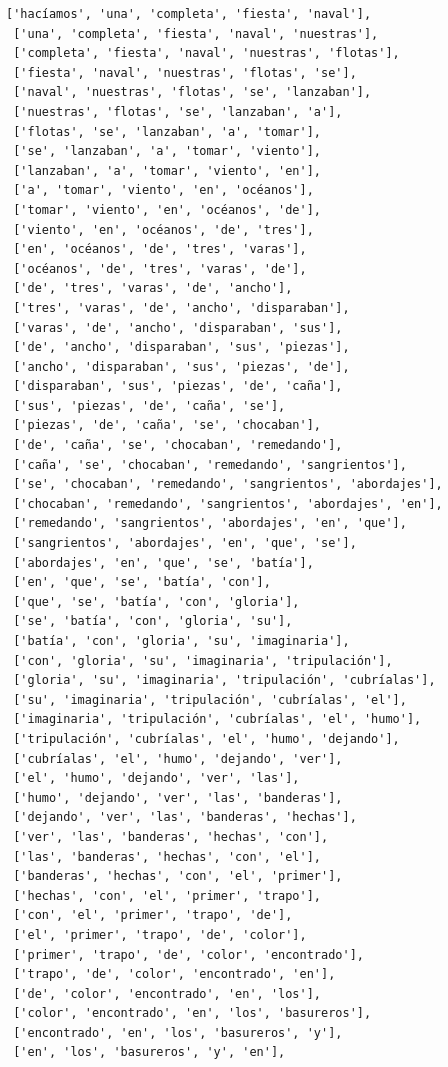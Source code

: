 \documentclass[11pt]{article}
\begin{document}
\begin{tcolorbox}[breakable, size=fbox, boxrule=1pt, pad at break*=1mm,colback=cellbackground, colframe=cellborder]
\begin{Verbatim}[commandchars=\\\{\}]
 ['hacíamos', 'una', 'completa', 'fiesta', 'naval'],
 ['una', 'completa', 'fiesta', 'naval', 'nuestras'],
 ['completa', 'fiesta', 'naval', 'nuestras', 'flotas'],
 ['fiesta', 'naval', 'nuestras', 'flotas', 'se'],
 ['naval', 'nuestras', 'flotas', 'se', 'lanzaban'],
 ['nuestras', 'flotas', 'se', 'lanzaban', 'a'],
 ['flotas', 'se', 'lanzaban', 'a', 'tomar'],
 ['se', 'lanzaban', 'a', 'tomar', 'viento'],
 ['lanzaban', 'a', 'tomar', 'viento', 'en'],
 ['a', 'tomar', 'viento', 'en', 'océanos'],
 ['tomar', 'viento', 'en', 'océanos', 'de'],
 ['viento', 'en', 'océanos', 'de', 'tres'],
 ['en', 'océanos', 'de', 'tres', 'varas'],
 ['océanos', 'de', 'tres', 'varas', 'de'],
 ['de', 'tres', 'varas', 'de', 'ancho'],
 ['tres', 'varas', 'de', 'ancho', 'disparaban'],
 ['varas', 'de', 'ancho', 'disparaban', 'sus'],
 ['de', 'ancho', 'disparaban', 'sus', 'piezas'],
 ['ancho', 'disparaban', 'sus', 'piezas', 'de'],
 ['disparaban', 'sus', 'piezas', 'de', 'caña'],
 ['sus', 'piezas', 'de', 'caña', 'se'],
 ['piezas', 'de', 'caña', 'se', 'chocaban'],
 ['de', 'caña', 'se', 'chocaban', 'remedando'],
 ['caña', 'se', 'chocaban', 'remedando', 'sangrientos'],
 ['se', 'chocaban', 'remedando', 'sangrientos', 'abordajes'],
 ['chocaban', 'remedando', 'sangrientos', 'abordajes', 'en'],
 ['remedando', 'sangrientos', 'abordajes', 'en', 'que'],
 ['sangrientos', 'abordajes', 'en', 'que', 'se'],
 ['abordajes', 'en', 'que', 'se', 'batía'],
 ['en', 'que', 'se', 'batía', 'con'],
 ['que', 'se', 'batía', 'con', 'gloria'],
 ['se', 'batía', 'con', 'gloria', 'su'],
 ['batía', 'con', 'gloria', 'su', 'imaginaria'],
 ['con', 'gloria', 'su', 'imaginaria', 'tripulación'],
 ['gloria', 'su', 'imaginaria', 'tripulación', 'cubríalas'],
 ['su', 'imaginaria', 'tripulación', 'cubríalas', 'el'],
 ['imaginaria', 'tripulación', 'cubríalas', 'el', 'humo'],
 ['tripulación', 'cubríalas', 'el', 'humo', 'dejando'],
 ['cubríalas', 'el', 'humo', 'dejando', 'ver'],
 ['el', 'humo', 'dejando', 'ver', 'las'],
 ['humo', 'dejando', 'ver', 'las', 'banderas'],
 ['dejando', 'ver', 'las', 'banderas', 'hechas'],
 ['ver', 'las', 'banderas', 'hechas', 'con'],
 ['las', 'banderas', 'hechas', 'con', 'el'],
 ['banderas', 'hechas', 'con', 'el', 'primer'],
 ['hechas', 'con', 'el', 'primer', 'trapo'],
 ['con', 'el', 'primer', 'trapo', 'de'],
 ['el', 'primer', 'trapo', 'de', 'color'],
 ['primer', 'trapo', 'de', 'color', 'encontrado'],
 ['trapo', 'de', 'color', 'encontrado', 'en'],
 ['de', 'color', 'encontrado', 'en', 'los'],
 ['color', 'encontrado', 'en', 'los', 'basureros'],
 ['encontrado', 'en', 'los', 'basureros', 'y'],
 ['en', 'los', 'basureros', 'y', 'en'],

\end{Verbatim}
\end{tcolorbox}
\end{document}
